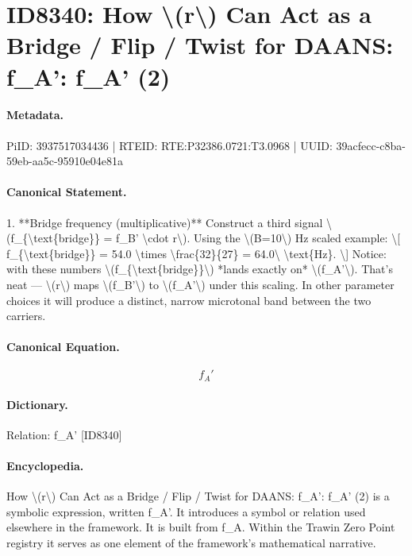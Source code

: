 \section*{ID8340: How \textbackslash{}(r\textbackslash{}) Can Act as a Bridge / Flip / Twist for DAANS: f\_A': f\_A' (2)}
\paragraph{Metadata.}
PiID: 3937517034436 | RTEID: RTE:P32386.0721:T3.0968 | UUID: 39acfecc-c8ba-59eb-aa5c-95910e04e81a

\paragraph{Canonical Statement.}
1. **Bridge frequency (multiplicative)** Construct a third signal \textbackslash{}(f\_\{\textbackslash{}text\{bridge\}\} = f\_B' \textbackslash{}cdot r\textbackslash{}). Using the \textbackslash{}(B=10\textbackslash{}) Hz scaled example: \textbackslash{}[ f\_\{\textbackslash{}text\{bridge\}\} = 54.0 \textbackslash{}times \textbackslash{}frac\{32\}\{27\} = 64.0\textbackslash{} \textbackslash{}text\{Hz\}. \textbackslash{}] Notice: with these numbers \textbackslash{}(f\_\{\textbackslash{}text\{bridge\}\}\textbackslash{}) *lands exactly on* \textbackslash{}(f\_A'\textbackslash{}). That’s neat — \textbackslash{}(r\textbackslash{}) maps \textbackslash{}(f\_B'\textbackslash{}) to \textbackslash{}(f\_A'\textbackslash{}) under this scaling. In other parameter choices it will produce a distinct, narrow microtonal band between the two carriers.

\paragraph{Canonical Equation.}
\[
f_A'
\]

\paragraph{Dictionary.}
Relation: f\_A' [ID8340]

\paragraph{Encyclopedia.}
How \textbackslash{}(r\textbackslash{}) Can Act as a Bridge / Flip / Twist for DAANS: f\_A': f\_A' (2) is a symbolic expression, written f\_A'. It introduces a symbol or relation used elsewhere in the framework. It is built from f\_A. Within the Trawin Zero Point registry it serves as one element of the framework's mathematical narrative.
